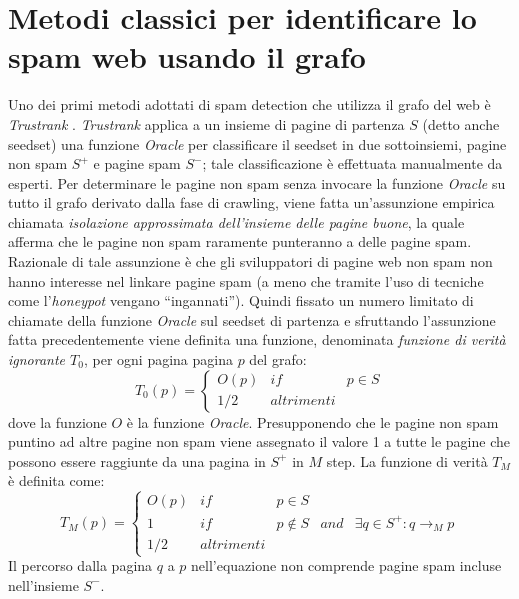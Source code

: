 \section{Metodi classici per identificare lo spam web usando il grafo}
Uno dei primi metodi adottati di spam detection che utilizza il grafo del web è \textit{Trustrank} \cite{Gyongyi:2004:CWS:1316689.1316740}. \textit{Trustrank} applica a un insieme di pagine di partenza \(S\) (detto anche seedset) una funzione \textit{Oracle} per classificare il seedset in due sottoinsiemi, pagine non spam \(S^+\) e pagine spam \(S^-\); tale classificazione è effettuata manualmente da esperti. Per determinare le pagine non spam senza invocare la funzione \textit{Oracle} su tutto il grafo derivato dalla fase di crawling, viene fatta un'assunzione empirica chiamata \textit{isolazione approssimata dell'insieme delle pagine buone}, la quale afferma che le pagine non spam raramente punteranno a delle pagine spam. Razionale di tale assunzione è che gli sviluppatori di pagine web non spam non hanno interesse nel linkare pagine spam (a meno che  tramite l'uso di tecniche come l'\textit{honeypot} vengano ``ingannati''). Quindi fissato un numero limitato di chiamate della funzione \textit{Oracle} sul 
seedset di partenza e sfruttando l'assunzione fatta precedentemente viene definita una funzione, denominata \textit{funzione di verità ignorante \(T_0\)}, per ogni pagina pagina \(p\) del grafo:
\begin{equation}
T_0(p)=\left\{
\begin{array}{ccc}
O(p) & if & p\in S \\
1/2 & altrimenti
\end{array}
\right .
\end{equation}
dove la funzione \(O\) è la funzione \textit{Oracle}. Presupponendo che le pagine non spam puntino ad altre pagine non spam viene assegnato il valore 1 a tutte le pagine che possono essere raggiunte da una pagina in \(S^+\) in \(M\) step. La funzione di verità \(T_M\) è definita come:
\begin{equation}
T_M(p)=\left\{
\begin{array}{ccccc}
O(p) & if & p\in S \\
1 & if & p \not\in S & and & \exists q\in S^+:q\rightarrow_M p \\
1/2 & altrimenti
\end{array}
\right .
\end{equation}
Il percorso  dalla pagina \(q\) a \(p\) nell'equazione non comprende pagine spam incluse nell'insieme \(S^-\).
